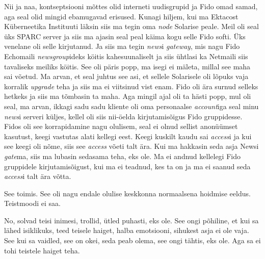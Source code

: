 Nii ja naa, kontseptsiooni mõttes olid interneti uudisgrupid ja Fido omad 
samad, aga seal olid mingid ebamugavad erisused. Kunagi  hiljem, kui ma 
Ektacost Küberneetika Instituuti läksin siis ma tegin oma 
\emph{node} Solarise peale. Meil oli seal üks 
SPARC server ja siis ma ajasin seal peal käima kogu selle Fido softi. Üks 
venelane oli selle kirjutanud. Ja siis ma tegin \emph{news}i \emph{gateway}, 
mis nagu Fido Echomaili \emph{newsgroup}ideks köitis kahesuunaliselt ja siis 
ühtlasi ka Netmaili siis tavaliseks meiliks köitis. See oli päris popp, ma 
isegi ei mäleta, millal see maha sai võetud. Ma arvan, et seal juhtus see asi, 
et sellele Solarisele oli lõpuks vaja  korralik \emph{upgrade} teha ja siis ma 
ei viitsinud vist enam. Fido oli ära surnud selleks hetkeks ja siis ma tõmbasin 
ta maha. Aga mingil ajal  oli ta hästi popp, mul oli seal, ma arvan, ikkagi 
sadu sadu kliente oli oma personaalse \emph{account}iga seal minu \emph{news}i 
serveri küljes, kellel oli siis nii-öelda kirjutamisõigus Fido gruppidesse. 
Fidos oli see korrapidamine nagu olulisem, seal ei olnud sellist anonüümset 
kasutust, keegi vastutas alati kellegi eest. Keegi  kuskilt kaudu sai 
\emph{access}i ja kui see keegi oli nõme, siis see \emph{access} võeti talt 
ära. Kui ma hakkasin seda asja Newsi \emph{gate}ma, siis ma lubasin sedasama 
teha, eks ole. Ma ei andnud kellelegi Fido gruppidele  kirjutamisõigust, kui ma 
ei teadnud, kes ta on ja ma ei saanud seda \emph{access}i talt ära võtta. 


See toimis. See oli nagu  endale olulise keskkonna  normaalsena hoidmise 
eeldus. Teistmoodi ei saa. 


No, solvad teisi inimesi, trollid, ütled puhasti, eks ole. See ongi põhiline, 
et kui sa lähed isiklikuks, teed teisele haiget, halba emotsiooni, sihukest 
asja ei ole vaja. See kui sa vaidled, see on okei, seda peab olema, see ongi 
tähtis, eks ole. Aga sa ei tohi  teistele haiget teha. 


